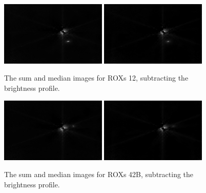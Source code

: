 \documentclass[12pt]{article}
\begin{document}
\begin{figure}[H]
\centering
\includegraphics[width=0.45\textwidth]{sum_sub_12.png}
\includegraphics[width=0.45\textwidth]{med_sub_12.png}
\vspace{-1em}
\caption{The sum and median images for ROXs 12, subtracting the brightness profile.}
\end{figure}
\vspace{-1em}
\begin{figure}[H]
\centering
\includegraphics[width=0.45\textwidth]{sum_sub_42b.png}
\includegraphics[width=0.45\textwidth]{med_sub_42b.png}
\vspace{-1em}
\caption{The sum and median images for ROXs 42B, subtracting the brightness profile.}
\end{figure}
\vspace{-1em}
\end{document}
